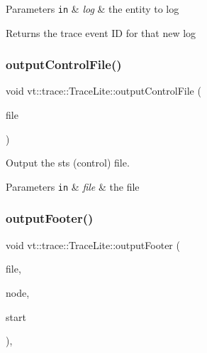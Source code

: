 \begin{DoxyParams}[1]{Parameters}
\mbox{\tt in}  & {\em log} & the entity to log\\
\hline
\end{DoxyParams}
\begin{DoxyReturn}{Returns}
the trace event ID for that new log 
\end{DoxyReturn}
\mbox{\label{structvt_1_1trace_1_1_trace_lite_a7b60eedbf68a4989a1566f2cf85d94dd}} 
\subsubsection{\texorpdfstring{output\+Control\+File()}{outputControlFile()}}
{\footnotesize\ttfamily void vt\+::trace\+::\+Trace\+Lite\+::output\+Control\+File (\begin{DoxyParamCaption}\item[{std\+::ofstream \&}]{file }\end{DoxyParamCaption})\hspace{0.3cm}{\ttfamily [protected]}}



Output the sts (control) file. 


\begin{DoxyParams}[1]{Parameters}
\mbox{\tt in}  & {\em file} & the file \\
\hline
\end{DoxyParams}
\mbox{\label{structvt_1_1trace_1_1_trace_lite_af0dc30a8b2b52fc291d90f606f585a2d}} 
\subsubsection{\texorpdfstring{output\+Footer()}{outputFooter()}}
{\footnotesize\ttfamily void vt\+::trace\+::\+Trace\+Lite\+::output\+Footer (\begin{DoxyParamCaption}\item[{\hyperlink{structvt_1_1trace_1_1vt__gz_file}{vt\+\_\+gz\+File} $\ast$}]{file,  }\item[{\hyperlink{namespacevt_a866da9d0efc19c0a1ce79e9e492f47e2}{Node\+Type} const}]{node,  }\item[{double const}]{start }\end{DoxyParamCaption})\hspace{0.3cm}{\ttfamily [static]}, {\ttfamily [protected]}}



